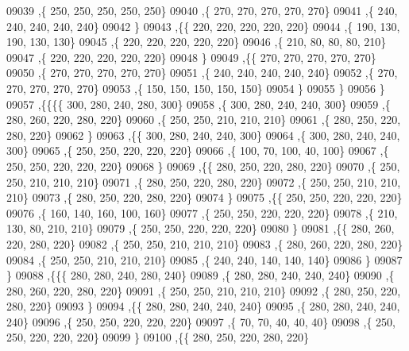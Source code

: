 \begin{DoxyCode}
09039     ,\{   250,   250,   250,   250,   250\}
09040     ,\{   270,   270,   270,   270,   270\}
09041     ,\{   240,   240,   240,   240,   240\}
09042     \}
09043    ,\{\{   220,   220,   220,   220,   220\}
09044     ,\{   190,   130,   190,   130,   130\}
09045     ,\{   220,   220,   220,   220,   220\}
09046     ,\{   210,    80,    80,    80,   210\}
09047     ,\{   220,   220,   220,   220,   220\}
09048     \}
09049    ,\{\{   270,   270,   270,   270,   270\}
09050     ,\{   270,   270,   270,   270,   270\}
09051     ,\{   240,   240,   240,   240,   240\}
09052     ,\{   270,   270,   270,   270,   270\}
09053     ,\{   150,   150,   150,   150,   150\}
09054     \}
09055    \}
09056   \}
09057  ,\{\{\{\{   300,   280,   240,   280,   300\}
09058     ,\{   300,   280,   240,   240,   300\}
09059     ,\{   280,   260,   220,   280,   220\}
09060     ,\{   250,   250,   210,   210,   210\}
09061     ,\{   280,   250,   220,   280,   220\}
09062     \}
09063    ,\{\{   300,   280,   240,   240,   300\}
09064     ,\{   300,   280,   240,   240,   300\}
09065     ,\{   250,   250,   220,   220,   220\}
09066     ,\{   100,    70,   100,    40,   100\}
09067     ,\{   250,   250,   220,   220,   220\}
09068     \}
09069    ,\{\{   280,   250,   220,   280,   220\}
09070     ,\{   250,   250,   210,   210,   210\}
09071     ,\{   280,   250,   220,   280,   220\}
09072     ,\{   250,   250,   210,   210,   210\}
09073     ,\{   280,   250,   220,   280,   220\}
09074     \}
09075    ,\{\{   250,   250,   220,   220,   220\}
09076     ,\{   160,   140,   160,   100,   160\}
09077     ,\{   250,   250,   220,   220,   220\}
09078     ,\{   210,   130,    80,   210,   210\}
09079     ,\{   250,   250,   220,   220,   220\}
09080     \}
09081    ,\{\{   280,   260,   220,   280,   220\}
09082     ,\{   250,   250,   210,   210,   210\}
09083     ,\{   280,   260,   220,   280,   220\}
09084     ,\{   250,   250,   210,   210,   210\}
09085     ,\{   240,   240,   140,   140,   140\}
09086     \}
09087    \}
09088   ,\{\{\{   280,   280,   240,   280,   240\}
09089     ,\{   280,   280,   240,   240,   240\}
09090     ,\{   280,   260,   220,   280,   220\}
09091     ,\{   250,   250,   210,   210,   210\}
09092     ,\{   280,   250,   220,   280,   220\}
09093     \}
09094    ,\{\{   280,   280,   240,   240,   240\}
09095     ,\{   280,   280,   240,   240,   240\}
09096     ,\{   250,   250,   220,   220,   220\}
09097     ,\{    70,    70,    40,    40,    40\}
09098     ,\{   250,   250,   220,   220,   220\}
09099     \}
09100    ,\{\{   280,   250,   220,   280,   220\}

\end{DoxyCode}
